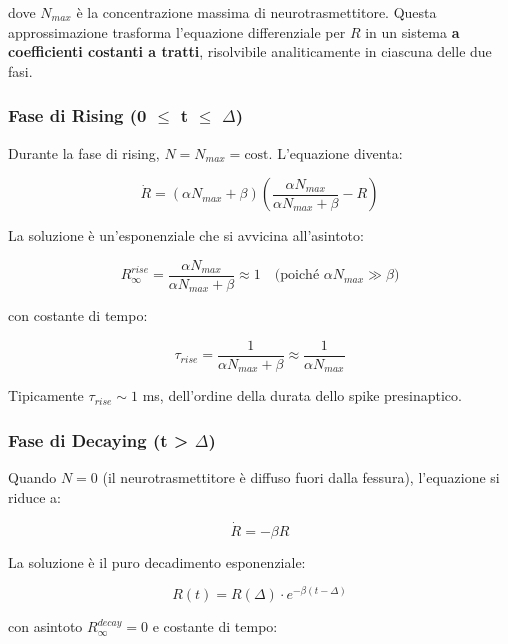 dove $N_{max}$ è la concentrazione massima di neurotrasmettitore. Questa approssimazione trasforma l'equazione differenziale per $R$ in un sistema \textbf{a coefficienti costanti a tratti}, risolvibile analiticamente in ciascuna delle due fasi.

\subsubsection{Fase di Rising (0 $\leq$ t $\leq$ $\Delta$)}

Durante la fase di rising, $N = N_{max} = \text{cost}$. L'equazione diventa:

\begin{equation}
\dot{R} = (\alpha N_{max} + \beta)\left(\frac{\alpha N_{max}}{\alpha N_{max} + \beta} - R\right)
\end{equation}

La soluzione è un'esponenziale che si avvicina all'asintoto:

\begin{equation}
R_\infty^{rise} = \frac{\alpha N_{max}}{\alpha N_{max} + \beta} \approx 1 \quad \text{(poiché } \alpha N_{max} \gg \beta \text{)}
\end{equation}

con costante di tempo:

\begin{equation}
\tau_{rise} = \frac{1}{\alpha N_{max} + \beta} \approx \frac{1}{\alpha N_{max}}
\end{equation}

Tipicamente $\tau_{rise} \sim 1$ ms, dell'ordine della durata dello spike presinaptico.

\subsubsection{Fase di Decaying (t > $\Delta$)}

Quando $N = 0$ (il neurotrasmettitore è diffuso fuori dalla fessura), l'equazione si riduce a:

\begin{equation}
\dot{R} = -\beta R
\end{equation}

La soluzione è il puro decadimento esponenziale:

\begin{equation}
R(t) = R(\Delta) \cdot e^{-\beta(t - \Delta)}
\end{equation}

con asintoto $R_\infty^{decay} = 0$ e costante di tempo:


